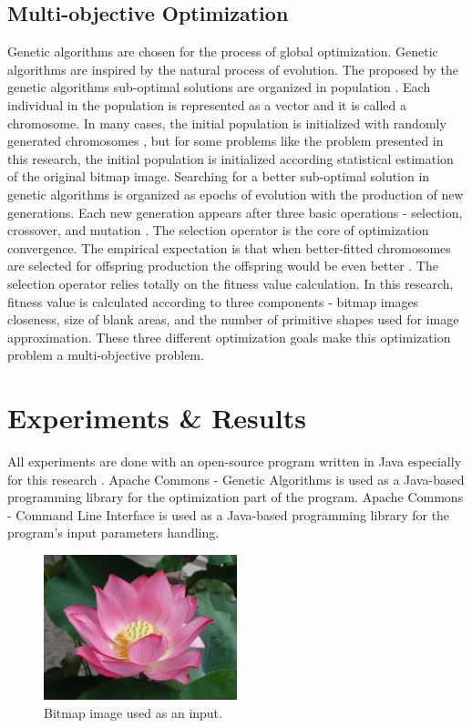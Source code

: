 \documentclass[conference]{IEEEtran}
\begin{document}
\subsection{Multi-objective Optimization}

Genetic algorithms are chosen for the process of global optimization. Genetic algorithms are inspired by the natural process of evolution. The proposed by the genetic algorithms sub-optimal solutions are organized in population \cite{Balabanov-Sevova-Kolev-2019}. Each individual in the population is represented as a vector and it is called a chromosome. In many cases, the initial population is initialized with randomly generated chromosomes \cite{Balabanov-Barova-Keremedchiev-2016}, but for some problems like the problem presented in this research, the initial population is initialized according statistical estimation of the original bitmap image. Searching for a better sub-optimal solution in genetic algorithms is organized as epochs of evolution with the production of new generations. Each new generation appears after three basic operations - selection, crossover, and mutation \cite{Balabanov-Zankinski-Barova-2016}. The selection operator is the core of optimization convergence. The empirical expectation is that when better-fitted chromosomes are selected for offspring production the offspring would be even better \cite{Balabanov-Zankinski-Dobrinkova-2011}. The selection operator relies totally on the fitness value calculation. In this research, fitness value is calculated according to three components - bitmap images closeness, size of blank areas, and the number of primitive shapes used for image approximation. These three different optimization goals make this optimization problem a multi-objective problem.  

\section{Experiments \& Results}

All experiments are done with an open-source program written in Java especially for this research \cite{Balabanov-2020}. Apache Commons - Genetic Algorithms \cite{Apache-Commons-Genetic-Algorithms-2020} is used as a Java-based programming library for the optimization part of the program. Apache Commons - Command Line Interface \cite{Apache-Commons-Command-Line-Interface-2020} is used as a Java-based programming library for the program's input parameters handling.

\begin{figure}[htbp]
\centerline{\includegraphics[width=0.5\textwidth]{fig01.png}}
\caption{Bitmap image used as an input.}
\label{fig01}
\end{figure}
\end{document}
